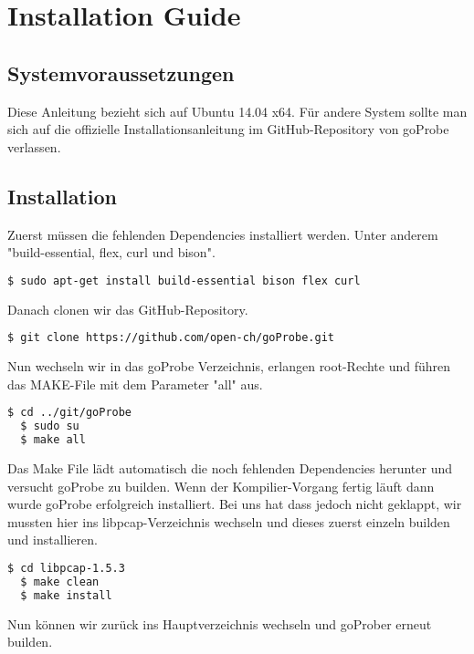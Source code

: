 \chapter{Installation Guide}


\section{Systemvoraussetzungen}
Diese Anleitung bezieht sich auf Ubuntu 14.04 x64. Für andere System sollte man sich auf die offizielle Installationsanleitung im GitHub-Repository von goProbe verlassen.

\section{Installation}
Zuerst müssen die fehlenden Dependencies installiert werden. Unter anderem "build-essential, flex, curl und bison".

\begin{lstlisting}[language=bash]
  $ sudo apt-get install build-essential bison flex curl
\end{lstlisting}

Danach clonen wir das GitHub-Repository.

\begin{lstlisting}[language=bash]
  $ git clone https://github.com/open-ch/goProbe.git
\end{lstlisting}

Nun wechseln wir in das goProbe Verzeichnis, erlangen root-Rechte und führen das MAKE-File mit dem Parameter "all" aus.

\begin{lstlisting}[language=bash]
  $ cd ../git/goProbe
  $ sudo su
  $ make all
\end{lstlisting}

Das Make File lädt automatisch die noch fehlenden Dependencies herunter und versucht goProbe zu builden. Wenn der Kompilier-Vorgang fertig läuft dann wurde goProbe erfolgreich installiert. Bei uns hat dass jedoch nicht geklappt, wir mussten hier ins libpcap-Verzeichnis wechseln und dieses zuerst einzeln builden und installieren.

\begin{lstlisting}[language=bash]
  $ cd libpcap-1.5.3
  $ make clean
  $ make install
\end{lstlisting}

Nun können wir zurück ins Hauptverzeichnis wechseln und goProber erneut builden.

